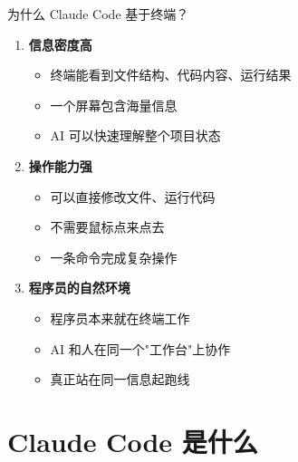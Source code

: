 \documentclass[aspectratio=169,xcolor=dvipsnames]{beamer}
\begin{document}
\begin{frame}{为什么 Claude Code 基于终端？}
  \begin{enumerate}
    \item \textbf{信息密度高}
    \begin{itemize}
      \item 终端能看到文件结构、代码内容、运行结果
      \item 一个屏幕包含海量信息
      \item AI 可以快速理解整个项目状态
    \end{itemize}

    \vspace{0.3cm}

    \item \textbf{操作能力强}
    \begin{itemize}
      \item 可以直接修改文件、运行代码
      \item 不需要鼠标点来点去
      \item 一条命令完成复杂操作
    \end{itemize}

    \vspace{0.3cm}

    \item \textbf{程序员的自然环境}
    \begin{itemize}
      \item 程序员本来就在终端工作
      \item AI 和人在同一个"工作台"上协作
      \item 真正站在同一信息起跑线
    \end{itemize}
  \end{enumerate}
\end{frame}

\section{Claude Code 是什么}
\end{document}
